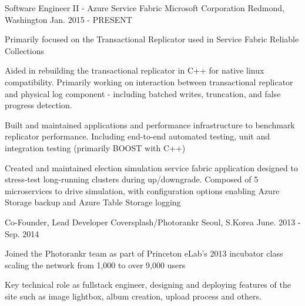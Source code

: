 

\begin{cventries}

  \cventry
    {Software Engineer II - Azure Service Fabric} %
    {Microsoft Corporation} %
    {Redmond, Washington} %
    {Jan. 2015 - PRESENT} %
    {
      \begin{cvitems} %
        \item {Primarily focused on the Transactional Replicator used in Service Fabric Reliable Collections}
        \item {Aided in rebuilding the transactional replicator in C++ for native linux compatibility. Primarily working on interaction between transactional replicator and physical log component - including batched writes, truncation, and false progress detection.}
        \item {Built and maintained applications and performance infrastructure to benchmark replicator performance. Including end-to-end automated testing, unit and integration testing (primarily BOOST with C++)}
        \item {Created and maintained election simulation service fabric application designed to stress-test long-running clusters during up/downgrade. Composed of 5 microservices to drive simulation, with configuration options enabling Azure Storage backup and Azure Table Storage logging}
      \end{cvitems}
    }

  \cventry
    {Co-Founder, Lead Developer} %
    {Coversplash/Photorankr} %
    {Seoul, S.Korea} %
    {June. 2013 - Sep. 2014} %
    {
      \begin{cvitems} %
        \item {Joined the Photorankr team as part of Princeton eLab’s 2013 incubator class scaling the network from 1,000 to over 9,000 users}
        \item {Key technical role as fullstack engineer, designing and deploying features of the site such as image lightbox, album creation, upload process and others.}
      \end{cvitems}
    }

\end{cventries}
